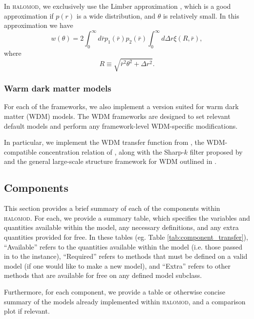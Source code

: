 \documentclass[5p]{elsarticle}
\newcommand{\halomod}{\textsc{halomod}}
\begin{document}
In \halomod, we exclusively use the Limber approximation \citep{Limber1953},
which is a good approximation if $p(r)$ is a wide distribution, and $\theta$ is relatively small. In this approximation we have
\begin{equation}
   w(\theta) = 2\int_0^\infty d\bar{r} p_1(\bar{r}) p_2(\bar{r}) \int_0^{\infty} d\Delta r \xi(R,\bar{r}), 
\end{equation}
where 
\begin{equation}
   R \equiv \sqrt{\bar{r}^2 \theta^2 + \Delta r^2}.
\end{equation}


\subsubsection{Warm dark matter models}
\label{sec:halomod:frameworks:wdm}
For each of the frameworks, we also implement a version suited for warm dark matter (WDM) models. The WDM frameworks are designed to set relevant default models and perform any framework-level WDM-specific modifications.

In particular, we implement the WDM transfer function from \cite{Viel2005}, the WDM-compatible concentration relation of \cite{Ludlow2016}, along with the Sharp-$k$ filter proposed by \cite{Schneider2012} and the general large-scale structure framework for WDM outlined in \cite{Smith2011a}.

\subsection{Components}
\label{sec:halomod:components}
This section provides a brief summary of each of the components within \textsc{halomod}. For each, we provide a summary table, which specifies the variables and quantities available within the model, any necessary definitions, and any extra quantities provided for free. In these tables (eg. Table \ref{tab:component_transfer}), ``Available'' refers to the quantities available within the model (i.e. those passed in to the instance), ``Required'' refers to methods that must be defined on a valid model (if one would like to make a new model), and ``Extra'' refers to other methods that are available for free on any defined model subclass. 

Furthermore, for each component, we provide a table or otherwise concise summary of the models already implemented within \textsc{halomod}, and a comparison plot if relevant. 
\end{document}
